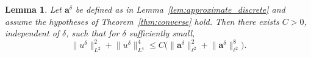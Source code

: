 \documentclass[a4paper,reqno,twoside]{amsart}
\numberwithin{equation}{section}
\newtheorem{lemma}[theorem]{Lemma}
\theoremstyle{definition}
\renewcommand{\tilde}{\widetilde}
\newcommand{\<}{\ensuremath \leq}
\renewcommand{\>}{\ensuremath \geq}
\renewcommand{\tilde}{\widetilde}
\begin{document}

\begin{lemma}\label{lem:normequivalence}
    Let $\mathbf{a}^\delta$ be defined as in
    Lemma~\ref{lem:approximate_discrete} and assume the hypotheses of
    Theorem~\ref{thm:converse} hold. Then there exists $C > 0$,
    independent of $\delta$, such that for $\delta$ sufficiently small,
    \begin{equation}
        \lVert u^\delta \rVert_{L^2}^2
        + \lVert u^\delta \rVert_{L^4}^4
        \leq C \bigl(
          \lVert \mathbf{a}^\delta \rVert_{\ell^2}^2
          + \lVert \mathbf{a}^\delta \rVert_{\ell^2}^8
        \bigr).
    \end{equation}
\end{lemma}
\end{document}
